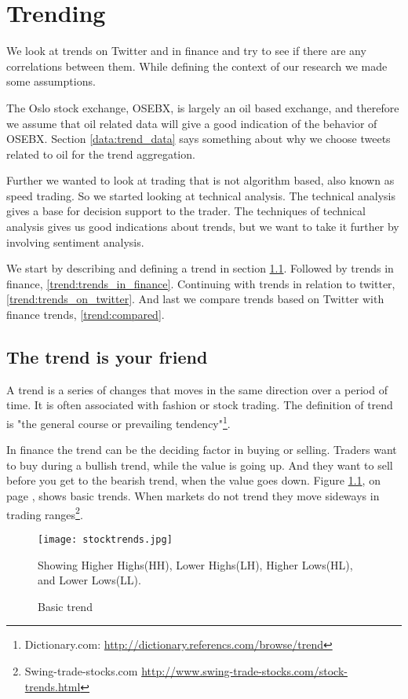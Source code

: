 \chapter{Trending}\label{trend}

We look at trends on Twitter and in finance and try to see if there are any
correlations between them. While defining the context of our research we made
some assumptions.

The Oslo stock exchange, OSEBX, is largely an oil based exchange, and
therefore we assume that oil related data will give a good indication of the
behavior of OSEBX. Section \ref{data:trend_data} says something about why we
choose tweets related to oil for the trend aggregation.

Further we wanted to look at trading that is not algorithm based, also
known as speed trading. So we started looking at technical analysis. The
technical analysis gives a base for decision support to the trader. The
techniques of technical analysis gives us good indications about trends, but we
want to take it further by involving sentiment analysis. 

We start by describing and defining a trend in section
\ref{trend:trend_is_your_friend}. 
Followed by trends in finance, \ref{trend:trends_in_finance}. 
Continuing with trends in relation to twitter, \ref{trend:trends_on_twitter}. 
And last we compare trends based on Twitter with finance trends, \ref{trend:compared}.
%

\section{The trend is your friend}\label{trend:trend_is_your_friend}
A trend is a series of changes that moves in the same direction over a period
of time. It is often associated with fashion or stock trading. The
definition of trend is "the general course or prevailing
tendency"\footnote{Dictionary.com:
\url{http://dictionary.referencs.com/browse/trend}}.

In finance the trend can be the deciding factor in buying or selling. Traders want
to buy during a bullish trend, while the value is going up. And they 
want to sell before you get to the bearish trend, when the value goes down.
Figure \ref{fig:stocktrends}, on page \pageref{fig:stocktrends}, shows basic
trends. When markets do not trend they move
sideways in trading ranges\footnote{Swing-trade-stocks.com
\url{http://www.swing-trade-stocks.com/stock-trends.html}}.   

\begin{figure}[htb]
    \centering
    \texttt{[image: stocktrends.jpg]} 
    \label{fig:stocktrends}
    \caption{Basic trend}
Showing Higher Highs(HH), Lower Highs(LH), Higher Lows(HL), and Lower Lows(LL). 
\end{figure}

